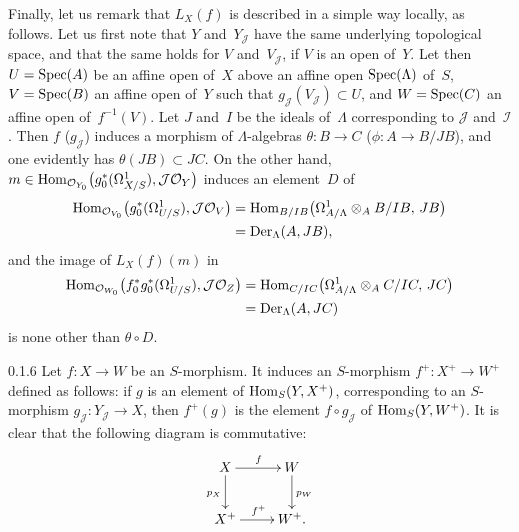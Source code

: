 Finally, let us remark that \(L_X(f)\) is described in a simple way
locally, as follows. Let us first note that \(Y\) and~\(Y_{\mathcal{J}}\)
have the same underlying topological space, and that the same holds for
\(V\) and~\(V_{\mathcal{J}}\), if \(V\) is an open of~\(Y\). Let then
\(U=\operatorname{Spec}(A)\) be an affine open of~\(X\) above an affine open
\(\operatorname{Spec}(\Lambda)\) of~\(S\), \(V=\operatorname{Spec}(B)\) an affine open of~\(Y\) such
that \(g_{\mathcal{J}}(V_{\mathcal{J}})\subset U\), and \(W=\operatorname{Spec}(C)\) an
affine open of~\(f^{-1}(V)\). Let \(J\) and~\(I\) be the ideals
of~\(\Lambda\) corresponding to \(\mathcal{J}\) and~\(\mathcal{I}\). Then
\(f\) (\resp \(g_{\mathcal{J}}\)) induces a morphism of
\(\Lambda\)-algebras \(\theta\colon B\to C\)
(\resp \(\phi\colon A\to B/JB\)), and one evidently has
\(\theta(JB)\subset JC\). On the other hand,
\(m\in\operatorname{Hom}_{\mathcal{O}_{Y_0}}\bigl(g_0^{*}(\Omega^1_{X/S}),\mathcal{J}\mathcal{O}_Y\bigr)\)
induces an element~\(D\) of
\begin{align*}
\operatorname{Hom}_{\mathcal{O}_{V_0}}\bigl(g_0^{*}(\Omega^1_{U/S}),\mathcal{J}\mathcal{O}_V\bigr)
&=\operatorname{Hom}_{B/IB}\bigl(\Omega^1_{A/\Lambda}\otimes_A B/IB,\,JB\bigr)\\
&=\operatorname{Der}_{\Lambda}(A,JB),
\end{align*}
and the image of \(L_X(f)(m)\) in
\begin{align*}
\operatorname{Hom}_{\mathcal{O}_{W_0}}\bigl(f_0^{*}g_0^{*}(\Omega^1_{U/S}),
\mathcal{J}\mathcal{O}_Z\bigr)
&=\operatorname{Hom}_{C/IC}\bigl(\Omega^1_{A/\Lambda}\otimes_A C/IC,\,JC\bigr)\\
&=\operatorname{Der}_{\Lambda}(A,JC)
\end{align*}
is none other than \(\theta\circ D\).

\begin{remark}{0.1.6}
\label{III.0.1.6}
{\renewcommand{\thefootnote}{(10)}}%
Let \(f\colon X\to W\) be an \(S\)-morphism. It induces an \(S\)-morphism
\(f^{+}\colon X^{+}\to W^{+}\) defined as follows: if \(g\) is an element
of \(\operatorname{Hom}_S(Y,X^{+})\), corresponding to an \(S\)-morphism
\(g_{\mathcal{J}}\colon Y_{\mathcal{J}}\to X\), then \(f^{+}(g)\) is the
element \(f\circ g_{\mathcal{J}}\) of \(\operatorname{Hom}_S(Y,W^{+})\). It is clear
that the following diagram is commutative:
\[
\xymatrix{
X \ar[r]^{f} \ar[d]_{p_X} & W \ar[d]^{p_W} \\
X^{+} \ar[r]^{f^{+}} & W^{+}.
}
\]
\end{remark}

